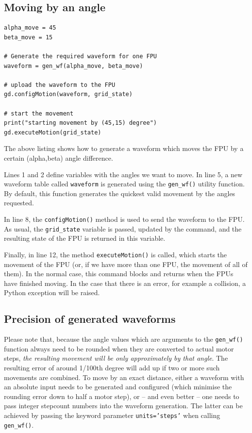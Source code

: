 \documentclass[fontsize=12,a4paper]{scrreprt}
\begin{document}
\subsection{Moving by an angle}
\begin{verbatim}
alpha_move = 45
beta_move = 15

# Generate the required waveform for one FPU
waveform = gen_wf(alpha_move, beta_move)

# upload the waveform to the FPU
gd.configMotion(waveform, grid_state)

# start the movement
print("starting movement by (45,15) degree")
gd.executeMotion(grid_state)
\end{verbatim}

The above listing shows how to generate a waveform which moves the FPU
by a certain (alpha,beta) angle difference.

Lines 1 and 2 define variables with the angles we want to move. In
line 5, a new waveform table called \texttt{waveform} is generated
using the \texttt{gen\_wf()} utility function.  By default, this
function generates the quickest valid movement by the angles
requested.

In line 8, the \texttt{configMotion()} method is used to send the
waveform to the FPU. As usual, the \texttt{grid\_state} variable is
passed, updated by the command, and the resulting state of the FPU is
returned in this variable.

Finally, in line 12, the method \texttt{executeMotion()} is called,
which starts the movement of the FPU (or, if we have more than one
FPU, the movement of all of them). In the normal case, this command
blocks and returns when the FPUs have finished moving.  In the case
that there is an error, for example a collision, a Python exception
will be raised.

\subsection{Precision of generated waveforms}

%
Please note that, because the angle values which are arguments to the
\texttt{gen\_wf()} function always need to be rounded when they are
converted to actual motor steps, \emph{the resulting movement will be
  only approximately by that angle}. The resulting error of around
1/100th degree will add up if two or more such movements are
combined. To move by an exact distance, either a waveform with an
absolute input needs to be generated and configured (which minimise
the rounding error down to half a motor step), or -- and even better
-- one needs to pass integer stepcount numbers into the waveform
generation. The latter can be achieved by passing the keyword
parameter \texttt{units='steps'} when calling \texttt{gen\_wf()}.
\end{document}
